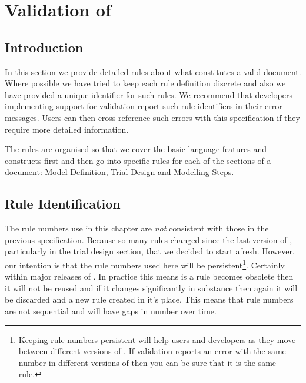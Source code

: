 \chapter{Validation of \pharmml}
\label{chapter:validation}

\newenvironment{valrules}{\begin{description}}{\end{description}}
\newcommand*{\valrule}[2]{\item[#1] \emph{#2}}

\renewcommand{\arraystretch}{1.25}


\section{Introduction}

In this section we provide detailed rules about what constitutes a
valid \pharmml document. Where possible we have tried to keep each
rule definition discrete and also we have provided a unique
identifier for such rules. We recommend that developers implementing
support for \pharmml validation report such rule identifiers in their
error messages. Users can then cross-reference such errors with this
specification if they require more detailed information.

The rules are organised so that we cover the basic language features
and constructs first and then go into specific rules for each of the
sections of a \pharmml document: Model Definition, Trial Design and
Modelling Steps.

\section{Rule Identification}

The rule numbers use in this chapter are \emph{not} consistent with
those in the previous specification. Because so many rules changed
since the last version of \pharmml, particularly in the trial design
section, that we decided to start afresh. However, our intention is
that the rule numbers used here will be persistent\footnote{Keeping
  rule numbers persistent will help users and developers as they move
  between different versions of \pharmml. If validation reports an
  error with the same number in different versions of \pharmml then
  you can be sure that it is the same rule.}. Certainly within major
releases of \pharmml. In practice this means is a rule becomes
obsolete then it will not be reused and if it changes significantly in
substance then again it will be discarded and a new rule created in
it's place. This means that rule numbers are not sequential and will
have gaps in number over time.

